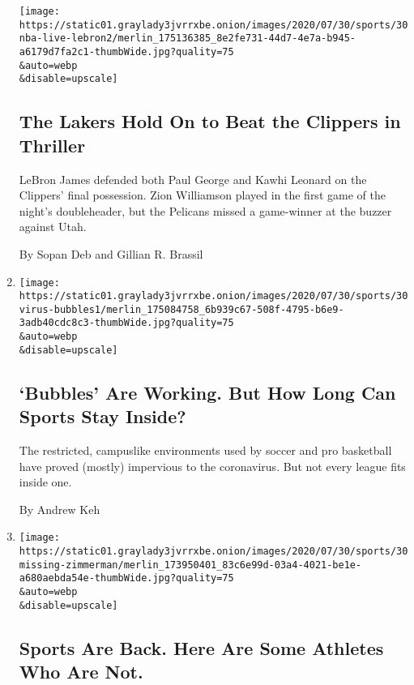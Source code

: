 \begin{enumerate}
  \texttt{[image: https://static01.graylady3jvrrxbe.onion/images/2020/07/30/sports/30nba-live-lebron2/merlin\_175136385\_8e2fe731-44d7-4e7a-b945-a6179d7fa2c1-thumbWide.jpg?quality=75\\\&auto=webp\\\&disable=upscale]}

  \hypertarget{the-lakers-hold-on-to-beat-the-clippers-in-thriller}{%
  \subsection{The Lakers Hold On to Beat the Clippers in
  Thriller}\label{the-lakers-hold-on-to-beat-the-clippers-in-thriller}}

  LeBron James defended both Paul George and Kawhi Leonard on the
  Clippers' final possession. Zion Williamson played in the first game
  of the night's doubleheader, but the Pelicans missed a game-winner at
  the buzzer against Utah.

  By Sopan Deb and Gillian R. Brassil
\item
  \href{/2020/07/30/sports/basketball/sports-bubble-nba-mlb.html}{}

  \texttt{[image: https://static01.graylady3jvrrxbe.onion/images/2020/07/30/sports/30virus-bubbles1/merlin\_175084758\_6b939c67-508f-4795-b6e9-3adb40cdc8c3-thumbWide.jpg?quality=75\\\&auto=webp\\\&disable=upscale]}

  \hypertarget{bubbles-are-working-but-how-long-can-sports-stay-inside}{%
  \subsection{`Bubbles' Are Working. But How Long Can Sports Stay
  Inside?}\label{bubbles-are-working-but-how-long-can-sports-stay-inside}}

  The restricted, campuslike environments used by soccer and pro
  basketball have proved (mostly) impervious to the coronavirus. But not
  every league fits inside one.

  By Andrew Keh
\item
  \href{/2020/07/30/sports/players-opt-out.html}{}

  \texttt{[image: https://static01.graylady3jvrrxbe.onion/images/2020/07/30/sports/30missing-zimmerman/merlin\_173950401\_83c6e99d-03a4-4021-be1e-a680aebda54e-thumbWide.jpg?quality=75\\\&auto=webp\\\&disable=upscale]}

  \hypertarget{sports-are-back-here-are-some-athletes-who-are-not}{%
  \subsection{Sports Are Back. Here Are Some Athletes Who Are
  Not.}\label{sports-are-back-here-are-some-athletes-who-are-not}}


\end{enumerate}
